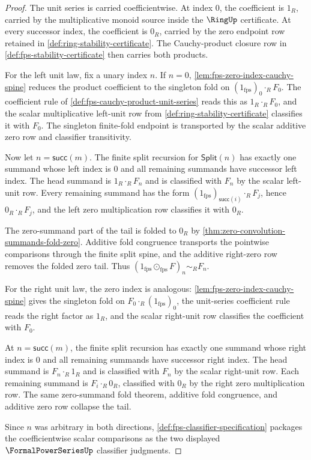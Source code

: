 \begin{proof}
The unit series is carried coefficientwise. At index $0$, the coefficient is $1_R$, carried by the multiplicative monoid source inside the $\RingUp$ certificate. At every successor index, the coefficient is $0_R$, carried by the zero endpoint row retained in \autoref{def:ring-stability-certificate}. The Cauchy-product closure row in \autoref{def:fps-stability-certificate} then carries both products.

For the left unit law, fix a unary index $n$. If $n=0$, \autoref{lem:fps-zero-index-cauchy-spine} reduces the product coefficient to the singleton fold on $(1_{\mathrm{fps}})_0\cdot_R F_0$. The coefficient rule of \autoref{def:fps-cauchy-product-unit-series} reads this as $1_R\cdot_R F_0$, and the scalar multiplicative left-unit row from \autoref{def:ring-stability-certificate} classifies it with $F_0$. The singleton finite-fold endpoint is transported by the scalar additive zero row and classifier transitivity.

Now let $n=\mathsf{succ}(m)$. The finite split recursion for $\mathsf{Split}(n)$ has exactly one summand whose left index is $0$ and all remaining summands have successor left index. The head summand is $1_R\cdot_R F_n$ and is classified with $F_n$ by the scalar left-unit row. Every remaining summand has the form $(1_{\mathrm{fps}})_{\mathsf{succ}(i)}\cdot_R F_j$, hence $0_R\cdot_R F_j$, and the left zero multiplication row classifies it with $0_R$.

The zero-summand part of the tail is folded to $0_R$ by \autoref{thm:zero-convolution-summands-fold-zero}. Additive fold congruence transports the pointwise comparisons through the finite split spine, and the additive right-zero row removes the folded zero tail. Thus $(1_{\mathrm{fps}}\odot_{\mathrm{fps}}F)_n\sim_R F_n$.

For the right unit law, the zero index is analogous: \autoref{lem:fps-zero-index-cauchy-spine} gives the singleton fold on $F_0\cdot_R(1_{\mathrm{fps}})_0$, the unit-series coefficient rule reads the right factor as $1_R$, and the scalar right-unit row classifies the coefficient with $F_0$.

At $n=\mathsf{succ}(m)$, the finite split recursion has exactly one summand whose right index is $0$ and all remaining summands have successor right index. The head summand is $F_n\cdot_R1_R$ and is classified with $F_n$ by the scalar right-unit row. Each remaining summand is $F_i\cdot_R0_R$, classified with $0_R$ by the right zero multiplication row. The same zero-summand fold theorem, additive fold congruence, and additive zero row collapse the tail.

Since $n$ was arbitrary in both directions, \autoref{def:fps-classifier-specification} packages the coefficientwise scalar comparisons as the two displayed $\FormalPowerSeriesUp$ classifier judgments.
\end{proof}

